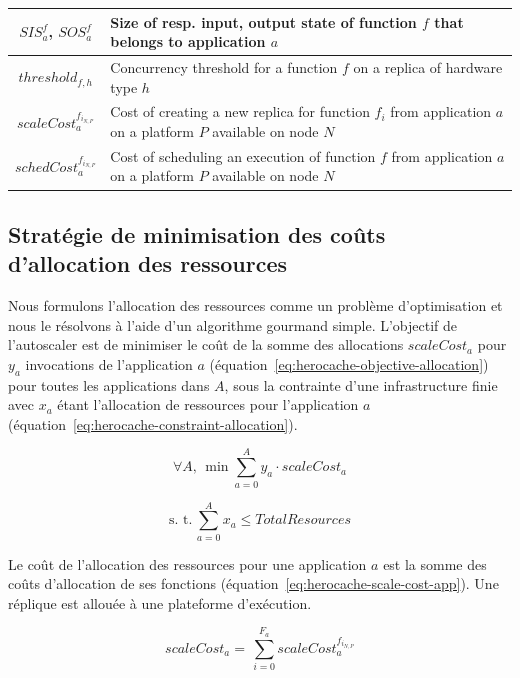\begin{table}[t]
\begin{center}
{\begin{tabularx}{\linewidth}{|c|Y|}
    $SIS^{f}_{a}$, $SOS^{f}_{a}$ & Size of resp. input, output state of function $f$ that belongs to application $a$ \\ \hline
    $threshold_{f, h}$ & Concurrency threshold for a function $f$ on a replica of hardware type $h$ \\ \hline
    $scaleCost^{{f}_{{i}_{N, P}}}_a$ & Cost of creating a new replica for function $f_i$ from application $a$ on a platform $P$ available on node $N$ \\ \hline
    $schedCost^{{f}_{{i}_{N, P}}}_a$ & Cost of scheduling an execution of function $f$ from application $a$ on a platform $P$ available on node $N$ \\ \hline
    \end{tabularx}}
    \label{table:herocache-notation}
    \end{center}
\end{table}

\subsection{Stratégie de minimisation des coûts d'allocation des ressources}

Nous formulons l'allocation des ressources comme un problème d'optimisation et nous le résolvons à l'aide d'un algorithme gourmand simple. L'objectif de l'autoscaler est de minimiser le coût de la somme des allocations $scaleCost_{a}$ pour $y_a$ invocations de l'application $a$ (équation~\ref{eq:herocache-objective-allocation}) pour toutes les applications dans $A$, sous la contrainte d'une infrastructure finie avec $x_a$ étant l'allocation de ressources pour l'application $a$ (équation~\ref{eq:herocache-constraint-allocation}). 

\begin{equation}
    \forall A, \, \min \sum_{a = 0}^{A} y_a \cdot scaleCost_{a}
\label{eq:herocache-objective-allocation}
\end{equation}

\begin{equation}
    \text{s. t.} \, \sum_{a = 0}^{A} x_a \leq Total Resources
\label{eq:herocache-constraint-allocation}
\end{equation}

Le coût de l'allocation des ressources pour une application $a$ est la somme des coûts d'allocation de ses fonctions (équation~\ref{eq:herocache-scale-cost-app}). Une réplique est allouée à une plateforme d'exécution.

\begin{equation}
    scaleCost_{a} = \, \sum_{i = 0}^{F_{a}} scaleCost^{{f}_{{i}_{N, P}}}_a
\label{eq:herocache-scale-cost-app}
\end{equation}

